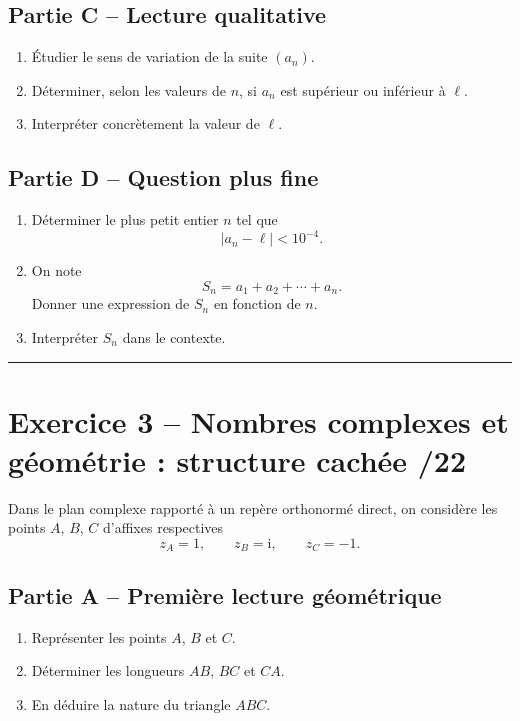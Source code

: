 \documentclass[11pt,a4paper]{article}
\newcommand{\ii}{\mathrm{i}}
\begin{document}
\subsection*{Partie C -- Lecture qualitative}
\begin{enumerate}[label=\textbf{2.\arabic*}, resume, leftmargin=1.6em]
    \item Étudier le sens de variation de la suite \((a_n)\).
    \item Déterminer, selon les valeurs de \(n\), si \(a_n\) est supérieur ou inférieur à \(\ell\).
    \item Interpréter concrètement la valeur de \(\ell\).
\end{enumerate}

\subsection*{Partie D -- Question plus fine}
\begin{enumerate}[label=\textbf{2.\arabic*}, resume, leftmargin=1.6em]
    \item Déterminer le plus petit entier \(n\) tel que
    \[
    |a_n-\ell|<10^{-4}.
    \]
    \item On note
    \[
    S_n=a_1+a_2+\cdots+a_n.
    \]
    Donner une expression de \(S_n\) en fonction de \(n\).
    \item Interpréter \(S_n\) dans le contexte.
\end{enumerate}

\vspace{0.5em}
\hrule
\vspace{0.6em}

\section*{Exercice 3 -- Nombres complexes et géométrie : structure cachée \hfill /22}

Dans le plan complexe rapporté à un repère orthonormé direct, on considère les points
\(A\), \(B\), \(C\) d'affixes respectives
\[
z_A=1,\qquad z_B=\ii,\qquad z_C=-1.
\]

\subsection*{Partie A -- Première lecture géométrique}
\begin{enumerate}[label=\textbf{3.\arabic*}, leftmargin=1.6em]
    \item Représenter les points \(A\), \(B\) et \(C\).
    \item Déterminer les longueurs \(AB\), \(BC\) et \(CA\).
    \item En déduire la nature du triangle \(ABC\).
\end{enumerate}
\end{document}
